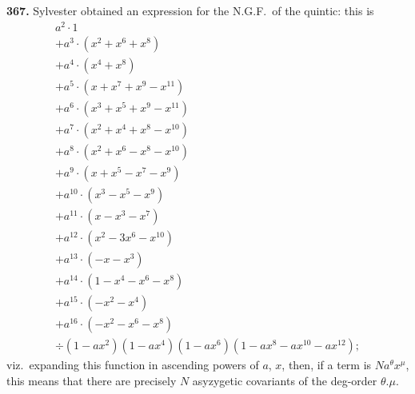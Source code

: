 \documentclass[11pt,a4paper]{book}
\begin{document}
\newpage
\noindent\textbf{367.} Sylvester obtained an expression for the N.G.F.\ of the quintic: this is
\begin{multline*}
a^2 \cdot 1\\
+ a^3 \cdot (x^2 + x^6 + x^8)\\
+ a^4 \cdot (x^4 + x^8)\\
+ a^5 \cdot (x + x^7 + x^9 - x^{11})\\
+ a^6 \cdot (x^3 + x^5 + x^9 - x^{11})\\
+ a^7 \cdot (x^2 + x^4 + x^8 - x^{10})\\
+ a^8 \cdot (x^2 + x^6 - x^8 - x^{10})\\
+ a^9 \cdot (x + x^5 - x^7 - x^9)\\
+ a^{10} \cdot (x^3 - x^5 - x^9)\\
+ a^{11} \cdot (x - x^3 - x^7)\\
+ a^{12} \cdot (x^2 - 3x^6 - x^{10})\\
+ a^{13} \cdot (-x - x^3)\\
+ a^{14} \cdot (1 - x^4 - x^6 - x^8)\\
+ a^{15} \cdot (-x^2 - x^4)\\
+ a^{16} \cdot (-x^2 - x^6 - x^8) \\
\div (1 - ax^2)(1 - ax^4)(1 - ax^6)(1 - ax^8 - ax^{10} - ax^{12});
\end{multline*}
viz.\ expanding this function in ascending powers of $a$, $x$, then, if a term is $Na^\theta x^\mu$, this means that there are precisely $N$ asyzygetic covariants of the deg-order $\theta.\mu$.

\medskip
\end{document}
